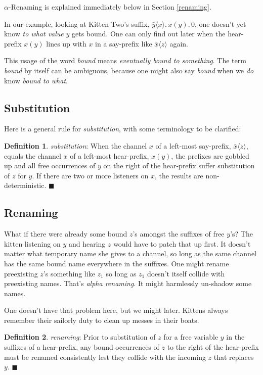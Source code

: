 \documentclass[10pt,oneside,x11names]{article}
\newcommand\napping    [0]{0}
\newcommand\chatting   [3]{\bar{#1}\langle{#2}\rangle{}.\,#3}
\newcommand\listening  [3]{#1(#2).\,#3}
\newcommand{\kitTwoSuffixx}{\chatting{y}{x}{\listening{x}{y}{\napping}}}
\theoremstyle{definition}
\newtheorem{definition}{Definition}
\theoremstyle{warning}
\begin{document}
\(\alpha\)\nobreakdash-Renaming is explained immediately below in
Section \ref{renaming}.

In our example, looking at Kitten Two's suffix,
\(\kitTwoSuffixx\), one doesn't yet know \emph{to what value} \(y\)
gets bound. One can only find out later when the hear-prefix
\(x(y)\) lines up with \(x\) in a say-prefix like
\(\bar{x}\langle{z}\rangle\) again.

This usage of the word
\emph{bound} means \emph{eventually bound to something}. The term
\emph{bound} by itself can be ambiguous, because one might also say
\emph{bound} when we \emph{do} know \emph{bound to what}.

\subsection{Substitution}
\label{sec:org5b08493}

Here is a general rule for \emph{substitution}, with some
terminology to be clarified:

\label{def:substitution}
\begin{definition}{\emph{substitution}:}
  When the channel $x$ of a left-most say-prefix, $\bar{x}\langle{z}\rangle$,
  equals the channel $x$ of a left-most hear-prefix, $x(y)$, the prefixes
  are gobbled up and all free occurrences of $y$ on the
  right of the hear-prefix suffer substitution of $z$ for $y$. If there
  are two or more listeners on $x$, the results are non-deterministic.
  $\blacksquare$
\end{definition}

\subsection{Renaming}
\label{sec:org29dc81c}
\label{renaming} What if there were already some bound \(z\)'s
amongst the suffixes of free \(y\)'s? The kitten listening on
\(y\) and hearing \(z\) would have to patch that up first. It
doesn't matter what temporary name she gives to a channel, so
long as the same channel has the same bound name everywhere in
the suffixes. One might rename preexisting \(z\)'s something
like \(z_1\) so long as \(z_1\) doesn't itself collide with
preexisting names. That's \emph{alpha renaming}. It might
harmlessly un-shadow some names.

One doesn't have that problem here, but we might later.
Kittens always remember their sailorly duty to clean up messes
in their boats.

\label{def:renaming}
\begin{definition}{\emph{renaming}:}
  Prior to substitution of $z$ for a free variable $y$ in the suffixes of
  a hear-prefix,
  any bound occurrences of $z$ to the right of the hear-prefix must be
  renamed consistently lest they collide with the incoming $z$
  that replaces $y$. $\blacksquare$
\end{definition}
\end{document}
